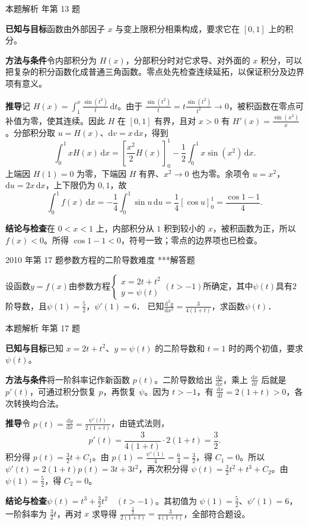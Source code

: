 \documentclass[UTF8,zihao=-4,fontset=fandol]{ctexart}
\newcounter{BankQuestion}
\newcommand{\QuestionPage}[7]{%
  \stepcounter{BankQuestion}%
  \par\noindent\begin{minipage}{\linewidth}
  \raggedright
  {\small\textcolor{black!60}{#3\quad #5\quad 难度 #7}\hfill\textcolor{accent}{#2}}\par\smallskip}
\newcommand{\QuestionEnd}{\end{minipage}\par\medskip}
\newcommand{\QuestionPage}[7]{%
  \clearpage
  \stepcounter{BankQuestion}%
  {\small\textcolor{accent}{#1\hfill #2}}\par\medskip
  {\small\textcolor{black!60}{#3\quad #5\quad 难度 #7\hfill \arabic{BankQuestion} / 234}}\par\vspace{9bp}}
\newcommand{\QuestionEnd}{}
\newenvironment{QuestionSolution}[1]{%
  \clearpage
  {\small\textcolor{black!60}{本题解析\quad #1}}\par\medskip
}{\par\clearpage}
\begin{document}
\begin{QuestionSolution}{2019 年第 13 题}
\textbf{已知与目标}\quad 函数由外部因子 \(x\) 与变上限积分相乘构成，要求它在 \([0,1]\) 上的积分。

\textbf{方法与条件}\quad 令内部积分为 \(H(x)\)，分部积分时对它求导、对外面的 \(x\) 积分，可以把复杂的积分函数化成普通三角函数。零点处先检查连续延拓，以保证积分及边界项有意义。

\textbf{推导}\quad 记 \(H(x)=\int_1^x\frac{\sin(t^2)}{t}\,\mathrm{d}t\)。由于 \(\frac{\sin(t^2)}{t}=t\frac{\sin(t^2)}{t^2}\to0\)，被积函数在零点可补值为零，使其连续。因此 \(H\) 在 \([0,1]\) 有界，且对 \(x>0\) 有 \(H'(x)=\frac{\sin(x^2)}{x}\)。分部积分取 \(u=H(x)\)、\(\mathrm{d}v=x\,\mathrm{d}x\)，得到
\[
\int_0^1xH(x)\,\mathrm{d}x
=\left[\frac{x^2}{2}H(x)\right]_0^1
-\frac{1}{2}\int_0^1x\sin(x^2)\,\mathrm{d}x.
\]
上端因 \(H(1)=0\) 为零，下端因 \(H\) 有界、\(x^2\to0\) 也为零。余项令 \(u=x^2\)，\(\mathrm{d}u=2x\,\mathrm{d}x\)，上下限仍为 \(0,1\)，故
\[
\int_0^1 f(x)\,\mathrm{d}x
=-\frac{1}{4}\int_0^1\sin u\,\mathrm{d}u
=\frac{1}{4}[\cos u]_0^1
=\boxed{\frac{\cos1-1}{4}}.
\]

\textbf{结论与检查}\quad 在 \(0<x<1\) 上，内部积分从 \(1\) 积到较小的 \(x\)，被积函数为正，所以 \(f(x)<0\)。所得 \(\cos1-1<0\)，符号一致；零点的边界项也已检查。
\end{QuestionSolution}

\QuestionPage{2.2 求导的基本法则}{解答题}{2010 年第 17 题}{3}{参数方程的二阶导数}{082 / 234}{***}
设函数$y = f(x)$由参数方程$\begin{cases}
  x = 2t + t^2 \\
  y = \psi(t)
\end{cases}(t > - 1)$所确定，其中$\psi (t)$具有$2$阶导数，且$\psi (1) = \frac{5}{2}$，$\psi'(1) = 6$．
已知$\frac{\mathrm{d}^2y}{\mathrm{d} x^2} = \frac{3}{4(1 + t)}$，求函数$\psi (t)$．
\QuestionEnd

\begin{QuestionSolution}{2010 年第 17 题}
\textbf{已知与目标}\quad 已知 \(x=2t+t^2\)、\(y=\psi(t)\) 的二阶导数和 \(t=1\) 时的两个初值，要求 \(\psi(t)\)。

\textbf{方法与条件}\quad 将一阶斜率记作新函数 \(p(t)\)。二阶导数给出 \(\frac{\mathrm dp}{\mathrm dx}\)，乘上 \(\frac{\mathrm dx}{\mathrm dt}\) 后就是 \(p'(t)\)，可通过积分恢复 \(p\)，再恢复 \(\psi\)。因为 \(t>-1\)，有 \(\frac{\mathrm dx}{\mathrm dt}=2(1+t)>0\)，各次转换均合法。

\textbf{推导}\quad 令 \(p(t)=\frac{\mathrm dy}{\mathrm dx}=\frac{\psi'(t)}{2(1+t)}\)，由链式法则，
\[
p'(t)=\frac{3}{4(1+t)}\cdot2(1+t)=\frac{3}{2}.
\]
积分得 \(p(t)=\frac32t+C_1\)。由 \(p(1)=\frac{\psi'(1)}4=\frac64=\frac32\)，得 \(C_1=0\)。所以 \(\psi'(t)=2(1+t)p(t)=3t+3t^2\)，再次积分得 \(\psi(t)=\frac32t^2+t^3+C_2\)。由 \(\psi(1)=\frac52\)，得 \(C_2=0\)。

\textbf{结论与检查}\quad \(\boxed{\psi(t)=t^3+\frac{3}{2}t^2\quad(t>-1)}\)。其初值为 \(\psi(1)=\frac52\)、\(\psi'(1)=6\)，一阶斜率为 \(\frac32t\)，再对 \(x\) 求导得 \(\frac{\frac32}{2(1+t)}=\frac3{4(1+t)}\)，全部符合题设。
\end{QuestionSolution}
\end{document}
